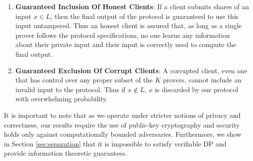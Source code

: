 \begin{enumerate}
	\item{\textbf{Guaranteed Inclusion Of Honest Clients}: If a client submits shares of an input $x \in L$, then the final output of the protocol is guaranteed to use this input untampered. Thus an honest client is assured that, as long as a single prover follows the protocol specifications, no one learns any information about their private input and their input is correctly used to compute the final output. }
	\item{\textbf{Guaranteed Exclusion Of Corrupt Clients}: A corrupted client, even one that has control over any proper subset of the $K$ provers, cannot include an invalid input to the protocol. Thus if $x \notin L$, $x$ is discarded by our protocol with overwhelming probability.}
\end{enumerate}

It is important to note that as we operate under stricter notions of privacy and correctness, our results require the use of public-key cryptography and security holds only against computationally bounded adversaries.  Furthermore, we show in Section \ref{sec:separation} that it is impossible to satisfy verifiable DP and provide information theoretic guarantees.

